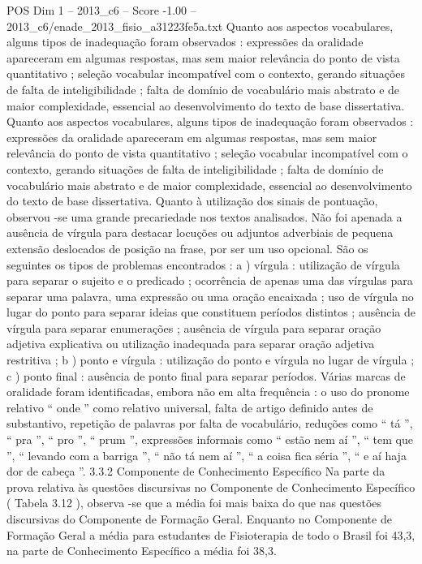 \begin{textsample}{POS Dim 1 – 2013\_c6 – Score -1.00 – 2013\_c6/enade\_2013\_fisio\_a31223fe5a.txt}
Quanto aos aspectos vocabulares, alguns tipos de inadequação foram observados : expressões da oralidade apareceram em algumas respostas, mas sem maior relevância do ponto de vista quantitativo ; seleção vocabular incompatível com o contexto, gerando situações de falta de inteligibilidade ; falta de domínio de vocabulário mais abstrato e de maior complexidade, essencial ao desenvolvimento do texto de base dissertativa.
Quanto aos aspectos vocabulares, alguns tipos de inadequação foram observados : expressões da oralidade apareceram em algumas respostas, mas sem maior relevância do ponto de vista quantitativo ; seleção vocabular incompatível com o contexto, gerando situações de falta de inteligibilidade ; falta de domínio de vocabulário mais abstrato e de maior complexidade, essencial ao desenvolvimento do texto de base dissertativa.
Quanto à utilização dos sinais de pontuação, observou -se uma grande precariedade nos textos analisados.
Não foi apenada a ausência de vírgula para destacar locuções ou adjuntos adverbiais de pequena extensão deslocados de posição na frase, por ser um uso opcional.
São os seguintes os tipos de problemas encontrados : a ) vírgula : utilização de vírgula para separar o sujeito e o predicado ; ocorrência de apenas uma das vírgulas para separar uma palavra, uma expressão ou uma oração encaixada ; uso de vírgula no lugar do ponto para separar ideias que constituem períodos distintos ; ausência de vírgula para separar enumerações ; ausência de vírgula para separar oração adjetiva explicativa ou utilização inadequada para separar oração adjetiva restritiva ; b ) ponto e vírgula : utilização do ponto e vírgula no lugar de vírgula ; c ) ponto final : ausência de ponto final para separar períodos.
Várias marcas de oralidade foram identificadas, embora não em alta frequência : o uso do pronome relativo “ onde ” como relativo universal, falta de artigo definido antes de substantivo, repetição de palavras por falta de vocabulário, reduções como “ tá ”, “ pra ”, “ pro ”, “ prum ”, expressões informais como “ estão nem aí ”, “ tem que ”, “ levando com a barriga ”, “ não tá nem aí ”, “ a coisa fica séria ”, “ e aí haja dor de cabeça ”. 3.3.2 Componente de Conhecimento Específico Na parte da prova relativa às questões discursivas no Componente de Conhecimento Específico ( Tabela 3.12 ), observa -se que a média foi mais baixa do que nas questões discursivas do Componente de Formação Geral.
Enquanto no Componente de Formação Geral a média para estudantes de Fisioterapia de todo o Brasil foi 43,3, na parte de Conhecimento Específico a média foi 38,3.

\end{textsample}
